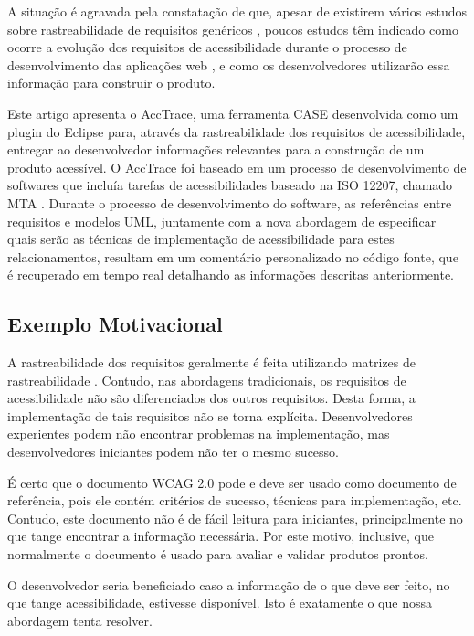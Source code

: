 \documentclass[runningheads,a4paper]{llncs}
\begin{document}
A situação é agravada pela constatação de que, apesar de existirem vários estudos sobre rastreabilidade de requisitos genéricos \cite{5970169,292398,5485417,6405269}, poucos estudos têm indicado como ocorre a evolução dos requisitos de acessibilidade durante o processo de desenvolvimento das aplicações web \cite{analuizadias:2010}, e como os desenvolvedores utilizarão essa informação para construir o produto.

Este artigo apresenta o AccTrace, uma ferramenta CASE desenvolvida como um
plugin do Eclipse para, através da rastreabilidade dos requisitos de
acessibilidade, entregar ao desenvolvedor informações relevantes para a
construção de um produto acessível. O AccTrace foi baseado em um processo de
desenvolvimento de softwares que incluía tarefas de acessibilidades baseado na
ISO 12207, chamado MTA \cite{maia:10}. Durante o processo de desenvolvimento do
software, as referências entre requisitos e modelos UML, juntamente com a nova
abordagem de especificar quais serão as técnicas de implementação de
acessibilidade para estes relacionamentos, resultam em um comentário
personalizado no código fonte, que é recuperado em tempo real detalhando as
informações descritas anteriormente.

\subsection{Exemplo Motivacional}

A rastreabilidade dos requisitos geralmente é feita utilizando matrizes de
rastreabilidade \cite{guo:2009:OBI:1681515.1682933}. Contudo, nas abordagens tradicionais, os
requisitos de acessibilidade não são diferenciados dos outros requisitos. Desta
forma, a implementação de tais requisitos não se torna explícita.
Desenvolvedores experientes podem não encontrar problemas na implementação, mas
desenvolvedores iniciantes podem não ter o mesmo sucesso.

É certo que o documento WCAG 2.0 pode e deve ser usado como documento de
referência, pois ele contém critérios de sucesso, técnicas para implementação,
etc. Contudo, este documento não é de fácil leitura para iniciantes,
principalmente no que tange encontrar a informação necessária. Por este motivo,
inclusive, que normalmente o documento é usado para avaliar e validar produtos
prontos.

O desenvolvedor seria beneficiado caso a informação de o que deve ser feito, no
que tange acessibilidade, estivesse disponível. Isto é exatamente o que nossa
abordagem tenta resolver.
\end{document}
